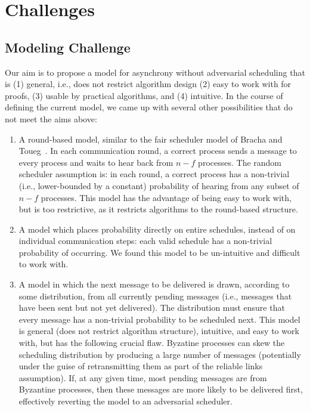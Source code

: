 \section{Challenges}\label{sec:challenges}

\subsection{Modeling Challenge}\label{sec:model-challenge}
Our aim is to propose a model for asynchrony without adversarial scheduling that is (1) general, i.e., does not restrict algorithm design (2) easy to work with for proofs, (3) usable by practical algorithms, and (4) intuitive.
In the course of defining the current model, we came up with several other possibilities that do not meet the aims above:
\begin{enumerate}
    \item A round-based model, similar to the fair scheduler model of Bracha and Toueg~\cite{BrachaT85}. In each communication round, a correct process sends a message to every process and waits to hear back from $n-f$ processes. The random scheduler assumption is: in each round, a correct process has a non-trivial (i.e., lower-bounded by a constant) probability of hearing from any subset of $n-f$ processes. This model has the advantage of being easy to work with, but is too restrictive, as it restricts algorithms to the round-based structure.
    \item A model which places probability directly on entire schedules, instead of on individual communication steps: each valid schedule has a non-trivial probability of occurring. We found this model to be un-intuitive and difficult to work with.
    \item A model in which the next message to be delivered is drawn, according to some distribution, from all currently pending messages (i.e., messages that have been sent but not yet delivered). The distribution must ensure that every message has a non-trivial probability to be scheduled next. This model is general (does not restrict algorithm structure), intuitive, and easy to work with, but has the following crucial flaw. Byzatine processes can skew the scheduling distribution by producing a large number of messages (potentially under the guise of retransmitting them as part of the reliable links assumption). If, at any given time, most pending messages are from Byzantine processes, then these messages are more likely to be delivered first, effectively reverting the model to an adversarial scheduler.

\end{enumerate}
